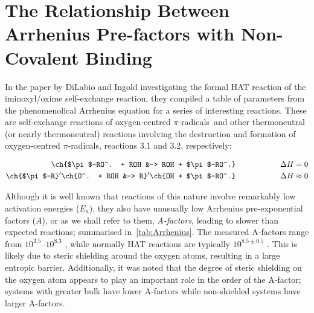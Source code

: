 
\chapter{The Relationship Between Arrhenius Pre-factors with Non-Covalent Binding}
\label{ch:arrhenius}

In the paper by DiLabio and Ingold\cite{DiLabio2005} investigating the formal HAT reaction of the iminoxyl/oxime self-exchange reaction, they compiled a table of parameters from the phenomenolical Arrhenius equation for a series of interesting reactions.\cite{Kreilick1966, Mader2004, Mahoney1970, DaRooge1967, Howard1973, Foti1994, Chenier1974, Chenier1975} These are self-exchange reactions of oxygen-centred $\pi$-radicals\footnotemark~and other thermoneutral (or nearly thermoneutral) reactions involving the destruction and formation of oxygen-centred $\pi$-radicals, reactions 3.1 and 3.2, respectively:


\begin{align}
  \ch{$\pi$-RO^. + ROH &-> ROH + $\pi$-RO^.} \hspace{2cm} \Delta H = 0 \\
  \ch{$\pi$-R}^\prime\ch{O^. + ROH &-> R}^\prime\ch{OH + $\pi$-RO^.} \hspace{2cm} \Delta H \approx 0
\end{align}

Although it is well known that reactions of this nature involve remarkably low activation energies ($E_a$),\cite{Lucarini1996,Mahoney1970a,Mahoney1975,Korcek1972} they also have unusually low Arrhenius pre-exponential factors ($A$), or as we shall refer to them, \emph{A-factors}, leading to slower than expected reactions; summarised in~\ref{tab:Arrhenius}. The measured A-factors range from $10^{3.5}$--$10^{8.3}$ \Ms, while normally HAT reactions are typically $10^{8.5\pm0.5}$ \Ms.\cite{Benson1976} This is likely due to steric shielding around the oxygen atoms, resulting in a large entropic barrier.\cite{DiLabio2005} Additionally, it was noted that the degree of steric shielding on the oxygen atom appears to play an important role in the order of the A-factor; systems with greater bulk have lower A-factors while non-shielded systems have larger A-factors.

